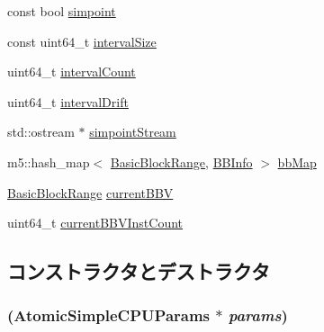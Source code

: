 \begin{Indent}{\bf }\par
{\em \label{_amgrpd41d8cd98f00b204e9800998ecf8427e}
 }\begin{DoxyCompactItemize}
\item 
const bool \hyperlink{classAtomicSimpleCPU_a556c6eb1f8f869ee7d0802381701c49f}{simpoint}
\item 
const uint64\_\-t \hyperlink{classAtomicSimpleCPU_afa2df438a2925349299948892f519ea2}{intervalSize}
\item 
uint64\_\-t \hyperlink{classAtomicSimpleCPU_a4ba2ebd08d9a7f8efe072ed006f2ba56}{intervalCount}
\item 
uint64\_\-t \hyperlink{classAtomicSimpleCPU_a0c93f234d5028e73f388f7e730db728f}{intervalDrift}
\item 
std::ostream $\ast$ \hyperlink{classAtomicSimpleCPU_a77497fabc62f774e824e9b57974e0301}{simpointStream}
\item 
m5::hash\_\-map$<$ \hyperlink{classstd_1_1pair}{BasicBlockRange}, \hyperlink{structAtomicSimpleCPU_1_1BBInfo}{BBInfo} $>$ \hyperlink{classAtomicSimpleCPU_a06bfab070d35f298897393f7ee6e066c}{bbMap}
\item 
\hyperlink{classstd_1_1pair}{BasicBlockRange} \hyperlink{classAtomicSimpleCPU_aa13454a445c3711abe528bdd288a953c}{currentBBV}
\item 
uint64\_\-t \hyperlink{classAtomicSimpleCPU_a375bb98c835fcacb306ec154ac3c7f85}{currentBBVInstCount}
\end{DoxyCompactItemize}
\end{Indent}


\subsection{コンストラクタとデストラクタ}
\hypertarget{classAtomicSimpleCPU_ad25e81d46bd9fe8b4f176b129a012bc6}{
\subsubsection[{AtomicSimpleCPU}]{ (AtomicSimpleCPUParams $\ast$ {\em params})}}
\label{classAtomicSimpleCPU_ad25e81d46bd9fe8b4f176b129a012bc6}



